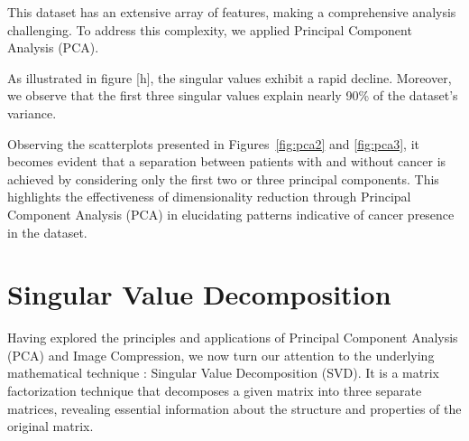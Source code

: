 \documentclass{article}
\begin{document}
\begin{figure}
    \centering

    \hfill
\end{figure}

This dataset has an extensive array of features, making a comprehensive analysis challenging. To address this complexity, we applied Principal Component Analysis (PCA).

As illustrated in {figure} [h], the singular values exhibit a rapid decline. Moreover, we observe that the first three singular values explain nearly 90\% of the dataset's variance.


Observing the scatterplots presented in Figures~\ref{fig:pca2} and \ref{fig:pca3}, it becomes evident that a separation between patients with and without cancer is achieved by considering only the first two or three principal components. This highlights the effectiveness of dimensionality reduction through Principal Component Analysis (PCA) in elucidating patterns indicative of cancer presence in the dataset.



\newpage



\section{Singular Value Decomposition}
Having explored the principles and applications of Principal Component Analysis (PCA) and Image Compression, we now turn our attention to the underlying mathematical technique : Singular Value Decomposition (SVD). It is a matrix factorization technique that decomposes a given matrix into three separate matrices, revealing essential information about the structure and properties of the original matrix.
\end{document}

